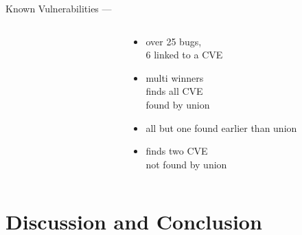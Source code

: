 \documentclass[\HandoutMode,table]{beamer}
\newcommand\figwidth\textwidth
\begin{document}
\begin{frame}
    {Known Vulnerabilities --- \listswf}
    \begin{columns}
        \begin{column}{.66\textwidth}
            \renewcommand\figwidth{.33\textwidth}
            \vspace{-20pt}
            \begin{figure}
                \vspace{-8pt}
            \end{figure}
        \end{column}
        \begin{column}{.33\textwidth}
            \begin{itemize}
                \item{} over 25 bugs,\\6 linked to a CVE
                \item{} multi winners\\finds all CVE\\found by union
                \item{} all but one found earlier than union
                \item{} finds two CVE\\not found by union
            \end{itemize}
        \end{column}
    \end{columns}
\end{frame}

\section{Discussion and Conclusion}

\begin{frame}
    \tableofcontents[currentsection]
\end{frame}
\end{document}
